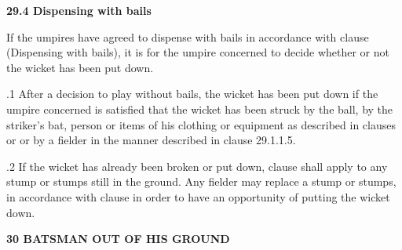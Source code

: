 \documentclass[12pt]{article}
\begin{document}
\vspace{\baselineskip}
{\fontsize{11pt}{13.2pt}\selectfont \textbf{29.4 \tabto{0.47in} Dispensing with bails}\par}\par


\vspace{\baselineskip}
\begin{adjustwidth}{0.0in}{0.18in}
{\fontsize{9pt}{10.8pt}\selectfont If the umpires have agreed to dispense with bails in accordance with clause (Dispensing with bails), it is for the umpire concerned to decide whether or not the wicket has been put down.\par}\par

\end{adjustwidth}


\vspace{\baselineskip}
\begin{adjustwidth}{0.5in}{0.1in}
{\fontsize{9pt}{10.8pt}.1 \tabto{0.49in} After a decision to play without bails, the wicket has been put down if the umpire concerned is satisfied that the wicket has been struck by the ball, by the striker’s bat, person or items of his clothing or equipment as described in clauses or or by a fielder in the manner described in clause 29.1.1.5.\par}\par

\end{adjustwidth}


\vspace{\baselineskip}
\begin{adjustwidth}{0.5in}{0.07in}
\begin{justify}
{\fontsize{9pt}{10.8pt}.2 \tabto{0.49in} If the wicket has already been broken or put down, clause shall apply to any stump or stumps still in the ground. Any fielder may replace a stump or stumps, in accordance with clause in order to have an opportunity of putting the wicket down.\par}
\end{justify}\par

\end{adjustwidth}


\vspace{\baselineskip}
{\fontsize{16pt}{19.2pt}\selectfont \textbf{30 BATSMAN OUT OF HIS GROUND}\par}\par
\end{document}
